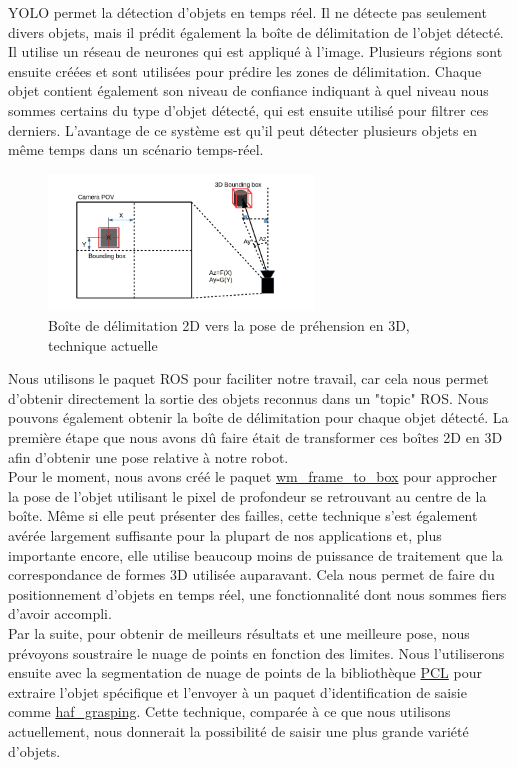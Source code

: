 \documentclass[runningheads,a4paper]{llncs}
\begin{document}
YOLO permet la détection d'objets en temps réel. Il ne détecte pas seulement divers objets, mais il prédit également la boîte de délimitation de l'objet détecté. Il utilise un réseau de neurones qui est appliqué à l'image. Plusieurs régions sont ensuite créées et sont utilisées pour prédire les zones de délimitation. Chaque objet contient également son niveau de confiance indiquant à quel niveau nous sommes certains du type d'objet détecté, qui est ensuite utilisé pour filtrer ces derniers. L'avantage de ce système est qu'il peut détecter plusieurs objets en même temps dans un scénario temps-réel. \\

 
\begin{figure}
  \centering
  \includegraphics[width=200pt]{images/frame_to_box.png}
  \caption{Boîte de délimitation 2D vers la pose de préhension en 3D, technique actuelle}
\end{figure} 
 
Nous utilisons le paquet ROS pour faciliter notre travail, car cela nous permet d'obtenir directement la sortie des objets reconnus dans un "topic" ROS. Nous pouvons également obtenir la boîte de délimitation pour chaque objet détecté. La première étape que nous avons dû faire était de transformer ces boîtes 2D en 3D afin d'obtenir une pose relative à notre robot. \\

Pour le moment, nous avons créé le paquet \href{https://github.com/WalkingMachine/wm_frame_to_box}{wm\_frame\_to\_box} pour approcher la pose de l'objet utilisant le pixel de profondeur se retrouvant au centre de la boîte. Même si elle peut présenter des failles, cette technique s'est également avérée largement suffisante pour la plupart de nos applications et, plus importante encore, elle utilise beaucoup moins de puissance de traitement que la correspondance de formes 3D utilisée auparavant. Cela nous permet de faire du positionnement d'objets en temps réel, une fonctionnalité dont nous sommes fiers d'avoir accompli. \\

Par la suite, pour obtenir de meilleurs résultats et une meilleure pose, nous prévoyons soustraire le nuage de points en fonction des limites. Nous l'utiliserons ensuite avec la segmentation de nuage de points de la bibliothèque \href{http://pointclouds.org}{PCL} pour extraire l'objet spécifique et l'envoyer à un paquet d'identification de saisie comme \href{http://wiki.ros.org/haf_grasping}{haf\_grasping}. Cette technique, comparée à ce que nous utilisons actuellement, nous donnerait la possibilité de saisir une plus grande variété d'objets. \\
\end{document}
